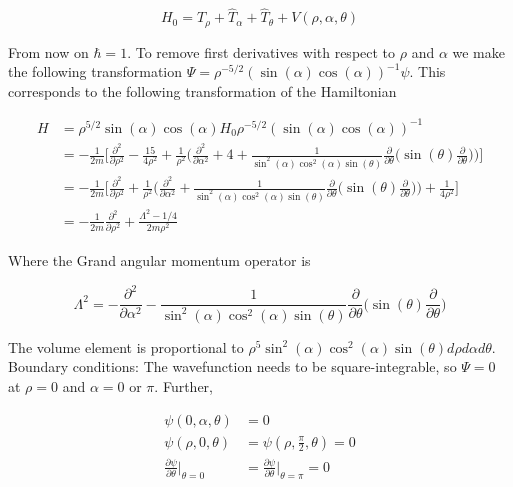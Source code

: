 \documentclass{article}
\begin{document}
\begin{equation}
H_0 = \hat{T}_{\rho} +  \hat{T}_{\alpha}+\hat{T}_{\theta} + V(\rho,\alpha,\theta)
\end{equation}

From now on $\hbar = 1$. To remove first derivatives with respect to $\rho$ and $\alpha$ we make the following transformation $\Psi = \rho^{-5/2}(\sin(\alpha)\cos(\alpha))^{-1}\psi$. This corresponds to the following transformation of the Hamiltonian 

\begin{subequations}
\begin{align*}
	H &= \rho^{5/2}\sin(\alpha)\cos(\alpha) H_0 \rho^{-5/2}(\sin(\alpha)\cos(\alpha))^{-1}\\
	    &= -\frac{1}{2m} \Big[ \frac{\partial^2}{\partial\rho^2} - \frac{15}{4\rho^2} + \frac{1}{\rho^2}\Big( \frac{\partial^2}{\partial\alpha^2} + 4 + \frac{1}{\sin^2(\alpha)\cos^2(\alpha)\sin(\theta)} \frac{\partial}{\partial\theta} \Big( \sin(\theta) \frac{\partial}{\partial\theta} \Big) \Big) \Big]\\
	    &= -\frac{1}{2m} \Big[ \frac{\partial^2}{\partial\rho^2} + \frac{1}{\rho^2}\Big( \frac{\partial^2}{\partial\alpha^2} + \frac{1}{\sin^2(\alpha)\cos^2(\alpha)\sin(\theta)} \frac{\partial}{\partial\theta} \Big( \sin(\theta) \frac{\partial}{\partial\theta} \Big) \Big) + \frac{1}{4\rho^2} \Big]\\
	    &= -\frac{1}{2m}\frac{\partial^2}{\partial\rho^2} + \frac{\Lambda^2 - 1/4}{2m\rho^2}
\end{align*}   
\end{subequations}

Where the Grand angular momentum operator is

\begin{equation}
\Lambda^2 = -\frac{\partial^2}{\partial\alpha^2} - \frac{1}{\sin^2(\alpha)\cos^2(\alpha)\sin(\theta)} \frac{\partial}{\partial\theta} \Big( \sin(\theta) \frac{\partial}{\partial\theta}\Big)
\end{equation}

The volume element is proportional to $\rho^5\sin^2(\alpha)\cos^2(\alpha)\sin(\theta)d\rho d\alpha d\theta$. Boundary conditions:
The wavefunction needs to be square-integrable, so $\Psi = 0$ at $\rho=0$ and $\alpha = 0 $ or $\pi$. Further, 

\begin{subequations}
\begin{align*}
	\psi(0,\alpha,\theta) &= 0\\
	\psi(\rho,0,\theta)    &= \psi(\rho,\frac{\pi}{2},\theta) = 0\\
	\frac{\partial\psi}{\partial\theta}\bigg\rvert_{\theta = 0} &= \frac{\partial\psi}{\partial\theta}\bigg\rvert_{\theta = \pi} = 0
\end{align*}   
\end{subequations} 
\end{document}
